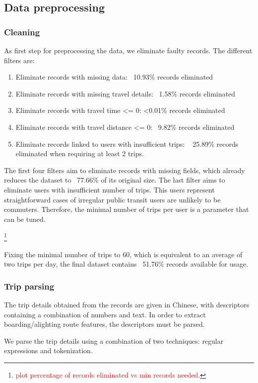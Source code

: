 \documentclass{article}
\newcommand{\selfnote}[1]{\footnote{\textcolor{red}{#1}}}
\begin{document}
\subsection{Data preprocessing}

\subsubsection{Cleaning}
As first step for preprocessing the data, we eliminate faulty records. The different filters are:

\begin{enumerate}
\item Eliminate records with missing data: ~10.93\% records eliminated
\item Eliminate records with missing travel details: ~1.58\% records eliminated
\item Eliminate records with travel time <= 0: <0.01\% records eliminated
\item Eliminate records with travel distance <= 0: ~9.82\% records eliminated
\item Eliminate records linked to users with insufficient trips: ~ 25.89\% records eliminated when requiring at least 2 trips.
\end{enumerate}

The first four filters aim to eliminate records with missing fields, which already reduces the dataset to ~77.66\% of its original size. The last filter aims to eliminate users with insufficient number of trips. This users represent straightforward cases of irregular public transit users are unlikely to be commuters. Therefore, the minimal number of trips per user is a parameter that can be tuned. 

\selfnote{plot percentage of records eliminated vs min records needed.}

Fixing the minimal number of trips to 60, which is equivalent to an average of two trips per day, the final dataset contains ~51.76\% records available for usage.  

\subsubsection{Trip parsing} 
\label{sec:tripParsing}
The trip details obtained from the records are given in Chinese, with descriptors containing a combination of numbers and text. In order to extract boarding/alighting route features, the descriptors must be parsed. 

We parse the trip details using a combination of two techniques: regular expressions and tokenization. 
\end{document}
